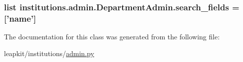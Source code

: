 \hypertarget{classinstitutions_1_1admin_1_1_department_admin_aea0751d1d5399292d91445e2a5339e98}{
\subsubsection[{search\-\_\-fields}]{\setlength{\rightskip}{0pt plus 5cm}list institutions.\-admin.\-Department\-Admin.\-search\-\_\-fields = \mbox{[}'name'\mbox{]}\hspace{0.3cm}{\ttfamily [static]}}}\label{classinstitutions_1_1admin_1_1_department_admin_aea0751d1d5399292d91445e2a5339e98}


The documentation for this class was generated from the following file\-:\begin{DoxyCompactItemize}
\item 
leapkit/institutions/\hyperlink{institutions_2admin_8py}{admin.\-py}\end{DoxyCompactItemize}
